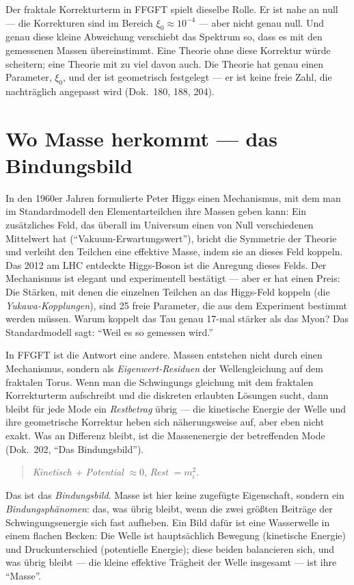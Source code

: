 Der fraktale Korrekturterm in FFGFT spielt dieselbe Rolle. Er ist
nahe an null --- die Korrekturen sind im Bereich $\xi_0 \approx
10^{-4}$ --- aber nicht genau null. Und genau diese kleine Abweichung
verschiebt das Spektrum so, dass es mit den gemessenen Massen
übereinstimmt. Eine Theorie ohne diese Korrektur würde scheitern;
eine Theorie mit zu viel davon auch. Die Theorie hat genau einen
Parameter, $\xi_0$, und der ist geometrisch festgelegt --- er ist
keine freie Zahl, die nachträglich angepasst wird (Dok.~180, 188,
204).

\section{Wo Masse herkommt --- das Bindungsbild}

In den 1960er Jahren formulierte Peter Higgs einen Mechanismus, mit
dem man im Standardmodell den Elementarteilchen ihre Massen geben
kann: Ein zusätzliches Feld, das überall im Universum einen von Null
verschiedenen Mittelwert hat (\enquote{Vakuum-Erwartungswert}), bricht
die Symmetrie der Theorie und verleiht den Teilchen eine effektive
Masse, indem sie an dieses Feld koppeln. Das 2012 am LHC entdeckte
Higgs-Boson ist die Anregung dieses Felds. Der Mechanismus ist
elegant und experimentell bestätigt --- aber er hat einen Preis:
Die Stärken, mit denen die einzelnen Teilchen an das Higgs-Feld
koppeln (die \emph{Yukawa-Kopplungen}), sind 25 freie Parameter, die
aus dem Experiment bestimmt werden müssen. Warum koppelt das Tau
genau 17-mal stärker als das Myon? Das Standardmodell sagt: \enquote{Weil
es so gemessen wird.}

In FFGFT ist die Antwort eine andere. Massen entstehen nicht durch
einen Mechanismus, sondern als \emph{Eigenwert-Residuen} der
Wellengleichung auf dem fraktalen Torus. Wenn man die Schwingungs%
gleichung mit dem fraktalen Korrekturterm aufschreibt und die
diskreten erlaubten Lösungen sucht, dann bleibt für jede Mode ein
\emph{Restbetrag} übrig --- die kinetische Energie der Welle und ihre
geometrische Korrektur heben sich näherungsweise auf, aber eben nicht
exakt. Was an Differenz bleibt, ist die Massenenergie der
betreffenden Mode (Dok.~202, \enquote{Das Bindungsbild}).

\begin{quote}
\textit{Kinetisch + Potential} $\approx 0$, \emph{Rest} $= m_i^2$.
\end{quote}

Das ist das \emph{Bindungsbild}. Masse ist hier keine zugefügte
Eigenschaft, sondern ein \emph{Bindungsphänomen}: das, was übrig
bleibt, wenn die zwei größten Beiträge der Schwingungsenergie sich
fast aufheben. Ein Bild dafür ist eine Wasserwelle in einem flachen
Becken: Die Welle ist hauptsächlich Bewegung (kinetische Energie)
und Druckunterschied (potentielle Energie); diese beiden balancieren
sich, und was übrig bleibt --- die kleine effektive Trägheit der
Welle insgesamt --- ist ihre \enquote{Masse}.

